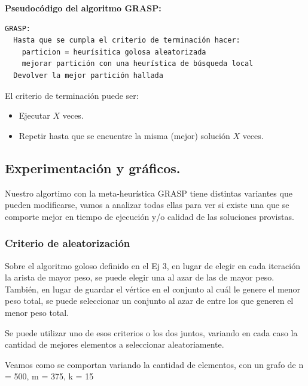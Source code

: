 \vspace*{0.35cm}

\textbf{Pseudocódigo del algoritmo GRASP:}

\vspace*{0.1cm}

\begin{verbatim}
GRASP:
  Hasta que se cumpla el criterio de terminación hacer:
    particion = heurísitica golosa aleatorizada
    mejorar partición con una heurística de búsqueda local
  Devolver la mejor partición hallada
\end{verbatim}

El criterio de terminación puede ser:
\begin{itemize}
  \item Ejecutar $X$ veces.
  \item Repetir hasta que se encuentre la misma (mejor) solución $X$ veces.
\end{itemize}

\newpage
\subsection{Experimentación y gráficos.}
\vspace*{0.3cm}

Nuestro algortimo con la meta-heurística GRASP tiene distintas variantes que
pueden modificarse, vamos a analizar todas ellas para ver si existe una que
se comporte mejor en tiempo de ejecución y/o calidad de las soluciones
provistas.

\subsubsection{Criterio de aleatorización}

Sobre el algoritmo goloso definido en el Ej 3, en lugar de elegir en cada
iteración la arista de mayor peso, se puede elegir una al azar de las de mayor
peso. También, en lugar de guardar el vértice en el conjunto al cuál le genere
el menor peso total, se puede seleccionar un conjunto al azar de entre los que
generen el menor peso total.

Se puede utilizar uno de esos criterios o los dos juntos, variando en cada
caso la cantidad de mejores elementos a seleccionar aleatoriamente.

Veamos como se comportan variando la cantidad de elementos, con un grafo de
n = 500, m = 375, k = 15
\vspace*{0.5cm}

